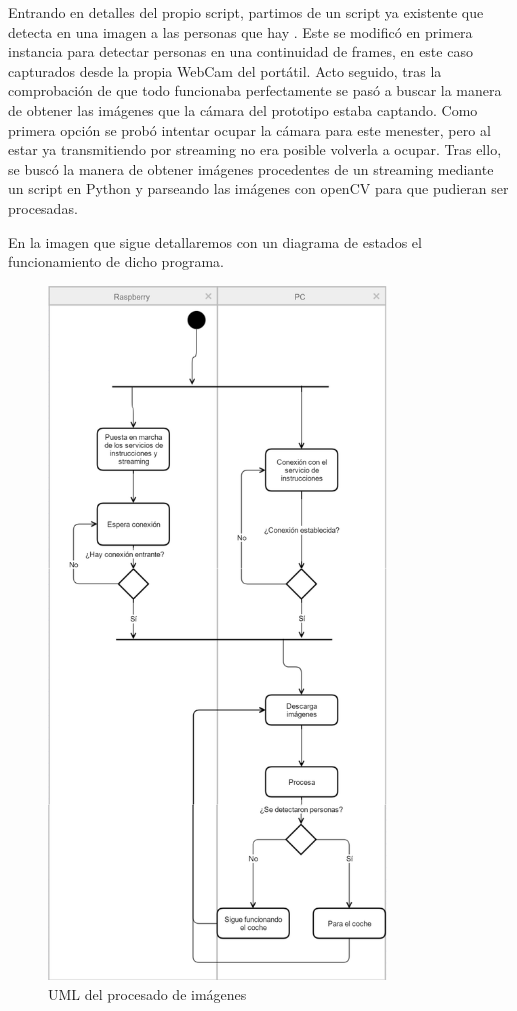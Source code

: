 \documentclass{pclass}
\begin{document}
\begin{itemize}
\begin{itemize}
		Entrando en detalles del propio script, partimos de un script ya existente que detecta en una imagen a las personas que hay \cite{pedestrian}. Este se modificó en primera instancia para detectar personas en una continuidad de frames, en este caso capturados desde la propia WebCam del portátil. Acto seguido, tras la comprobación de que todo funcionaba perfectamente se pasó a buscar la manera de obtener las imágenes que la cámara del prototipo estaba captando. Como primera opción se probó intentar ocupar la cámara para este menester, pero al estar ya transmitiendo por streaming no era posible volverla a ocupar. Tras ello, se buscó la manera de obtener imágenes procedentes de un streaming mediante un script en Python y parseando las imágenes con openCV para que pudieran ser procesadas.
		
		En la imagen que sigue detallaremos con un diagrama de estados el funcionamiento de dicho programa.
		
		\begin{figure}[H]
			\centering
			\includegraphics[width=0.8\textwidth]{img/procesadoUML}
			\caption{UML del procesado de imágenes}
			\label{fig:procesadoUML}
		\end{figure}
		

\end{itemize}
\end{itemize}
\end{document}
